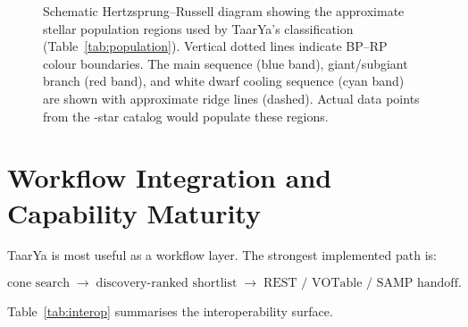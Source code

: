\documentclass[preprint,12pt,authoryear]{elsarticle}
\begin{document}
\begin{figure}[htbp]
\caption{\label{fig:hr_schematic}Schematic Hertzsprung--Russell diagram showing the approximate stellar population regions used by \textsf{TaarYa}'s classification (Table~\ref{tab:population}). Vertical dotted lines indicate BP--RP colour boundaries. The main sequence (blue band), giant/subgiant branch (red band), and white dwarf cooling sequence (cyan band) are shown with approximate ridge lines (dashed). Actual data points from the \nStarsReal{}-star catalog would populate these regions.}
\end{figure}

\section{Workflow Integration and Capability Maturity}
\label{sec:workflow}

\textsf{TaarYa} is most useful as a workflow layer. The strongest implemented path is:

\[
\text{cone search} \;\rightarrow\; \text{discovery-ranked shortlist}
\;\rightarrow\; \text{REST / VOTable / SAMP handoff}.
\]

Table~\ref{tab:interop} summarises the interoperability surface.
\end{document}
